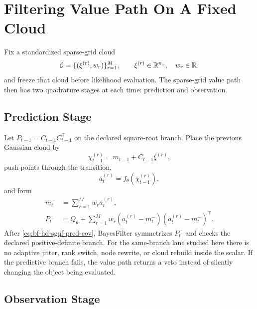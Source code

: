 \section{Filtering Value Path On A Fixed Cloud}
\label{sec:bf-hd-sgqf-value-path}

Fix a standardized sparse-grid cloud
\begin{equation}
  \mathcal C=\{(\xi^{(r)},w_r)\}_{r=1}^M,
  \qquad
  \xi^{(r)}\in\mathbb{R}^{n_x},
  \quad
  w_r\in\mathbb{R}.
  \label{eq:bf-hd-sgqf-cloud-for-filter}
\end{equation}
and freeze that cloud before likelihood evaluation.  The sparse-grid value path
then has two quadrature stages at each time: prediction and observation.

\subsection{Prediction Stage}
\label{sec:bf-hd-sgqf-prediction-stage}

Let \(P_{t-1}=C_{t-1}C_{t-1}^\top\) on the declared square-root branch.  Place
the previous Gaussian cloud by
\begin{equation}
  \chi_{t-1}^{(r)} = m_{t-1}+C_{t-1}\xi^{(r)},
  \label{eq:bf-hd-sgqf-pred-placed-points}
\end{equation}
push points through the transition,
\begin{equation}
  a_t^{(r)}=f_\theta(\chi_{t-1}^{(r)}),
  \label{eq:bf-hd-sgqf-transition-points}
\end{equation}
and form
\begin{align}
  m_t^-&=\sum_{r=1}^Mw_ra_t^{(r)},
  \label{eq:bf-hd-sgqf-pred-mean}\\
  P_t^-&=Q_\theta+\sum_{r=1}^Mw_r
  (a_t^{(r)}-m_t^-)(a_t^{(r)}-m_t^-)^\top.
  \label{eq:bf-hd-sgqf-pred-cov}
\end{align}
After \eqref{eq:bf-hd-sgqf-pred-cov}, BayesFilter symmetrizes \(P_t^-\) and
checks the declared positive-definite branch.  For the same-branch lane studied
here there is no adaptive jitter, rank switch, node rewrite, or cloud rebuild
inside the scalar.  If the predictive branch fails, the value path returns a
veto instead of silently changing the object being evaluated.

\subsection{Observation Stage}
\label{sec:bf-hd-sgqf-observation-stage}

